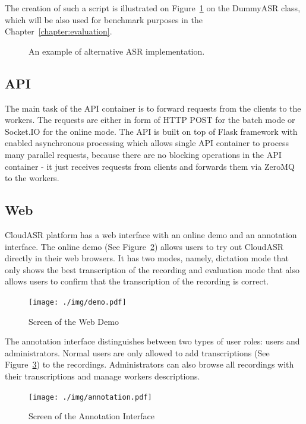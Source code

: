 The creation of such a script is illustrated on Figure~\ref{fig:dummyasr} on the DummyASR class,
  which will be also used for benchmark purposes in the Chapter~\ref{chapter:evaluation}.

\begin{figure}[h]
  

  \caption{An example of alternative ASR implementation.}
  \label{fig:dummyasr}
\end{figure}


\subsection{API}
The main task of the API container is to forward requests from the clients to the workers.
The requests are either in form of HTTP POST for the batch mode or Socket.IO for the online mode.
The API is built on top of Flask framework with enabled asynchronous processing
  which allows single API container to process many parallel requests,
  because there are no blocking operations in the API container -
  it just receives requests from clients and forwards them via ZeroMQ to the workers.


\subsection{Web}
CloudASR platform has a web interface with an online demo and an annotation interface.
The online demo (See Figure~\ref{fig:webdemo}) allows users to try out CloudASR directly in their web browsers.
It has two modes, namely, dictation mode that only shows the best transcription of the recording
  and evaluation mode that also allows users to confirm that the transcription of the recording is correct.

\begin{figure}[h]
  \centering
  \texttt{[image: ./img/demo.pdf]}

  \caption{Screen of the Web Demo}
  \label{fig:webdemo}
\end{figure}

The annotation interface distinguishes between two types of user roles: users and administrators.
Normal users are only allowed to add transcriptions (See Figure~\ref{fig:annotation-interface}) to the recordings.
Administrators can also browse all recordings with their transcriptions and manage workers descriptions.

\begin{figure}[h]
  \centering
  \texttt{[image: ./img/annotation.pdf]}

  \caption{Screen of the Annotation Interface}
  \label{fig:annotation-interface}
\end{figure}

